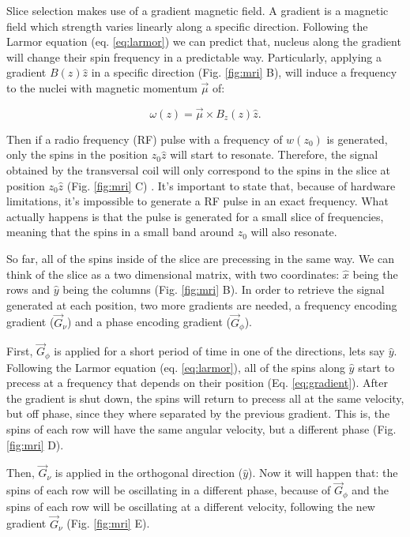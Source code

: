 Slice selection makes use of a gradient magnetic field. A gradient is a magnetic
field which strength varies linearly along a specific direction. Following the
Larmor equation (eq. \ref{eq:larmor}) we can predict that, nucleus along the
gradient will change their spin frequency in a predictable way. Particularly,
applying a gradient $B(z) \hat z$ in a specific direction (Fig. \ref{fig:mri} B),
will induce a frequency to the nuclei with magnetic momentum $\vec \mu$ of:

\begin{equation}
\label{eq:gradient}
    \omega(z) = \vec \mu \times B_z(z) \hat z.
\end{equation}

Then if a radio frequency (RF) pulse with a frequency of $w(z_0)$ is generated,
only the spins in the position $z_0 \hat z$ will start to resonate. Therefore,
the signal obtained by the transversal coil will only correspond to the spins in
the slice at position $z_0 \hat z $ (Fig. \ref{fig:mri} C) . It's important to state that, because of
hardware limitations, it's impossible to generate a RF pulse in an exact frequency.
What actually happens is that the pulse is generated for a small slice of
frequencies, meaning that the spins in a small band around $z_0$ will also
resonate.

So far, all of the spins inside of the slice are precessing in the same way.
We can think of the slice as a two dimensional matrix, with two coordinates:
$\hat x$ being the rows and $\hat y$ being the columns (Fig. \ref{fig:mri} B).
In order to retrieve the signal generated at each position, two more gradients
are needed, a frequency encoding gradient ($\vec G_{\nu}$) and a phase encoding
gradient ($\vec G_{\phi}$). 

First, $\vec G_{\phi}$ is applied for a short period of time in one of
the directions, lets say $\hat y$. Following the Larmor equation (eq. \ref{eq:larmor}),
all of the spins along $\hat y$ start to precess at a frequency that depends
on their position (Eq. \ref{eq:gradient}). After the gradient is shut down, the
spins will return to precess all at the same velocity, but off phase, since they 
where separated by the previous gradient. This is, the spins of each row will
have the same angular velocity, but a different phase (Fig. \ref{fig:mri} D).

Then, $\vec G_{\nu}$ is applied in the orthogonal direction ($\hat y$).
Now it will happen that: the spins of each row will be oscillating in a
different phase, because of $\vec G_{\phi}$ and the spins of each row will be
oscillating at a different velocity, following the new gradient $\vec G_{\nu}$
(Fig. \ref{fig:mri} E).

